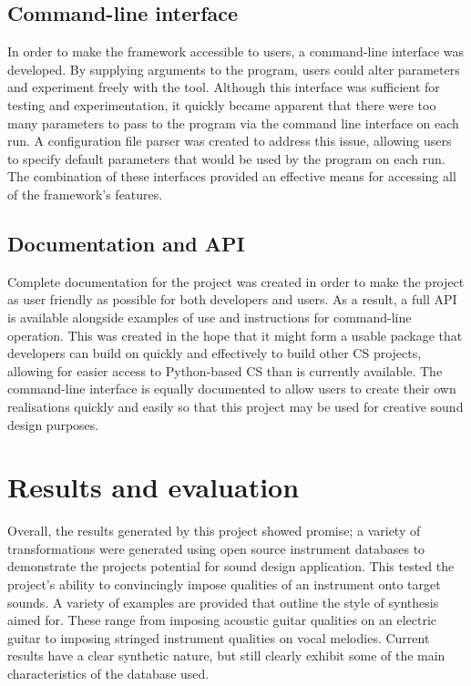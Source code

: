 \documentclass{scrartcl}
\begin{document}
    \subsection*{Command-line interface}
    In order to make the framework accessible to users, a command-line interface
    was developed. By supplying arguments to the program, users could alter
    parameters and experiment freely with the tool.  Although this interface
    was sufficient for testing and experimentation, it quickly became apparent
    that there were too many parameters to pass to the program via the command
    line interface on each run. A configuration file parser was created to
    address this issue, allowing users to specify default parameters that would
    be used by the program on each run. The combination of these interfaces
    provided an effective means for accessing all of the framework's features.

    \subsection*{Documentation and API}
    Complete documentation for the project was created in order to make the
    project as user friendly as possible for both developers and users.  As a
    result, a full API is available alongside examples of use and instructions
    for command-line operation. This was created in the hope that it might form
    a usable package that developers can build on quickly and effectively to
    build other CS projects, allowing for easier access to Python-based CS than
    is currently available. The command-line interface is equally documented to
    allow users to create their own realisations quickly and easily so that
    this project may be used for creative sound design purposes.

    \section*{Results and evaluation}
    Overall, the results generated by this project showed promise; a variety of
    transformations were generated using open source instrument databases to
    demonstrate the projects potential for sound design application. This
    tested the project's ability to convincingly impose qualities of an
    instrument onto target sounds. A variety of examples are provided that
    outline the style of synthesis aimed for. These range from imposing
    acoustic guitar qualities on an electric guitar to imposing stringed
    instrument qualities on vocal melodies. Current results have a clear
    synthetic nature, but still clearly exhibit some of the main
    characteristics of the database used.
\end{document}
